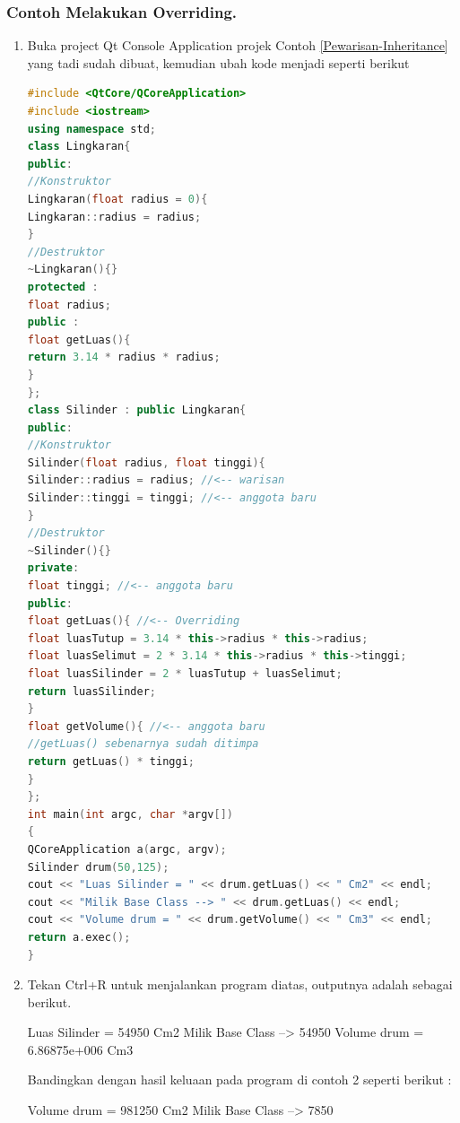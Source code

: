 \subsubsection*{Contoh Melakukan Overriding.}
\begin{enumerate}
	\def\labelenumi{\arabic{enumi}.}
	\tightlist
	\item Buka project Qt Console Application projek Contoh \ref{Pewarisan-Inheritance} yang tadi sudah
	dibuat, kemudian ubah kode menjadi seperti berikut
	
\begin{lstlisting}[language=c++, caption=Melakukan Overriding]
#include <QtCore/QCoreApplication>
#include <iostream>
using namespace std;
class Lingkaran{
public:
//Konstruktor
Lingkaran(float radius = 0){
Lingkaran::radius = radius;
}
//Destruktor
~Lingkaran(){}
protected :
float radius;
public :
float getLuas(){
return 3.14 * radius * radius;
}
};
class Silinder : public Lingkaran{
public:
//Konstruktor
Silinder(float radius, float tinggi){
Silinder::radius = radius; //<-- warisan
Silinder::tinggi = tinggi; //<-- anggota baru
}
//Destruktor
~Silinder(){}
private:
float tinggi; //<-- anggota baru
public:
float getLuas(){ //<-- Overriding
float luasTutup = 3.14 * this->radius * this->radius;
float luasSelimut = 2 * 3.14 * this->radius * this->tinggi;
float luasSilinder = 2 * luasTutup + luasSelimut;
return luasSilinder;
}
float getVolume(){ //<-- anggota baru
//getLuas() sebenarnya sudah ditimpa
return getLuas() * tinggi;
}
};
int main(int argc, char *argv[])
{
QCoreApplication a(argc, argv);
Silinder drum(50,125);
cout << "Luas Silinder = " << drum.getLuas() << " Cm2" << endl;
cout << "Milik Base Class --> " << drum.getLuas() << endl;
cout << "Volume drum = " << drum.getVolume() << " Cm3" << endl;
return a.exec();
}
\end{lstlisting}
	
	
		\item
		Tekan Ctrl+R untuk menjalankan program diatas, outputnya adalah
		sebagai berikut.

	
	\begin{lcverbatim}
	Luas Silinder = 54950 Cm2
	Milik Base Class --> 54950
	Volume drum = 6.86875e+006 Cm3
	\end{lcverbatim}
	
	Bandingkan dengan hasil keluaan pada program di contoh 2 seperti berikut
	:
	
	\begin{lcverbatim}
	Volume drum = 981250 Cm2
	Milik Base Class –> 7850
	\end{lcverbatim}
\end{enumerate}


